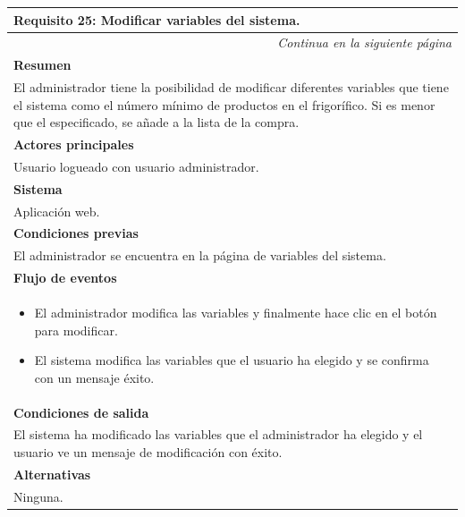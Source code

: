 \begin{longtable}{|p{}|}
\hline
 \rowcolor[gray]{.5}
 \color{white}\textbf{Requisito 25: Modificar variables del sistema.} \\
\hline
\endfirsthead
\endhead
\hline \multicolumn{1}{r}{\textit{Continua en la siguiente página}} \\
\endfoot
\endlastfoot
     \rowcolor[gray]{.9}
     \textbf{Resumen} \\
     \hline
     El administrador tiene la posibilidad de modificar diferentes variables que tiene el sistema como el número mínimo de productos en el frigorífico. Si es menor que el especificado, se añade a la lista de la compra. \\
     \hline
     \rowcolor[gray]{.9}
     \textbf{Actores principales} \\
     \hline
     Usuario logueado con usuario administrador. \\
     \hline
     \rowcolor[gray]{.9}
     \textbf{Sistema} \\
     \hline
     Aplicación web. \\
     \hline
     \rowcolor[gray]{.9}
     \textbf{Condiciones previas} \\
     \hline
     El administrador se encuentra en la página de variables del sistema. \\
     \hline
     \rowcolor[gray]{.9}
     \textbf{Flujo de eventos}  \\
     \hline
      \begin{itemize}
         \item El administrador modifica las variables y finalmente hace clic en el botón para modificar.
         \item El sistema modifica las variables que el usuario ha elegido y se confirma con un mensaje éxito.
     \end{itemize} \\
     \hline
     \rowcolor[gray]{.9}
     \textbf{Condiciones de salida} \\
     \hline
     El sistema ha modificado las variables que el administrador ha elegido y el usuario ve un mensaje de modificación con éxito. \\
     \hline
     \rowcolor[gray]{.9}
     \textbf{Alternativas}  \\
     \hline
      Ninguna. \\
     \hline
\end{longtable}

